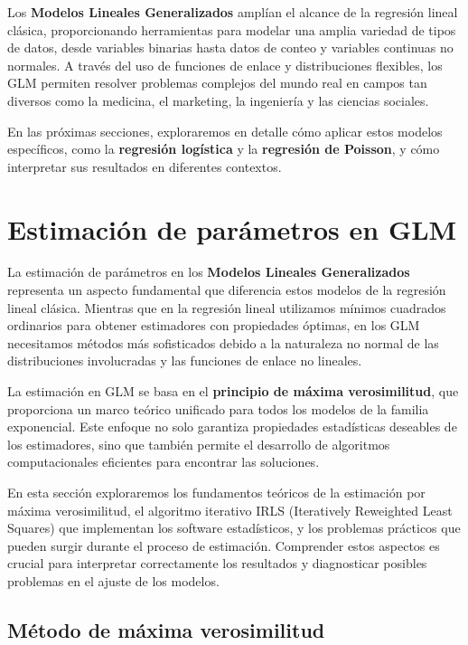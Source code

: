 \documentclass[
  letterpaper,
  DIV=11,
  numbers=noendperiod]{scrreprt}
\begin{document}
Los \textbf{Modelos Lineales Generalizados} amplían el alcance de la
regresión lineal clásica, proporcionando herramientas para modelar una
amplia variedad de tipos de datos, desde variables binarias hasta datos
de conteo y variables continuas no normales. A través del uso de
funciones de enlace y distribuciones flexibles, los GLM permiten
resolver problemas complejos del mundo real en campos tan diversos como
la medicina, el marketing, la ingeniería y las ciencias sociales.

En las próximas secciones, exploraremos en detalle cómo aplicar estos
modelos específicos, como la \textbf{regresión logística} y la
\textbf{regresión de Poisson}, y cómo interpretar sus resultados en
diferentes contextos.

\section{Estimación de parámetros en
GLM}\label{estimaciuxf3n-de-paruxe1metros-en-glm}

La estimación de parámetros en los \textbf{Modelos Lineales
Generalizados} representa un aspecto fundamental que diferencia estos
modelos de la regresión lineal clásica. Mientras que en la regresión
lineal utilizamos mínimos cuadrados ordinarios para obtener estimadores
con propiedades óptimas, en los GLM necesitamos métodos más sofisticados
debido a la naturaleza no normal de las distribuciones involucradas y
las funciones de enlace no lineales.

La estimación en GLM se basa en el \textbf{principio de máxima
verosimilitud}, que proporciona un marco teórico unificado para todos
los modelos de la familia exponencial. Este enfoque no solo garantiza
propiedades estadísticas deseables de los estimadores, sino que también
permite el desarrollo de algoritmos computacionales eficientes para
encontrar las soluciones.

En esta sección exploraremos los fundamentos teóricos de la estimación
por máxima verosimilitud, el algoritmo iterativo IRLS (Iteratively
Reweighted Least Squares) que implementan los software estadísticos, y
los problemas prácticos que pueden surgir durante el proceso de
estimación. Comprender estos aspectos es crucial para interpretar
correctamente los resultados y diagnosticar posibles problemas en el
ajuste de los modelos.

\subsection{Método de máxima
verosimilitud}\label{muxe9todo-de-muxe1xima-verosimilitud}
\end{document}
